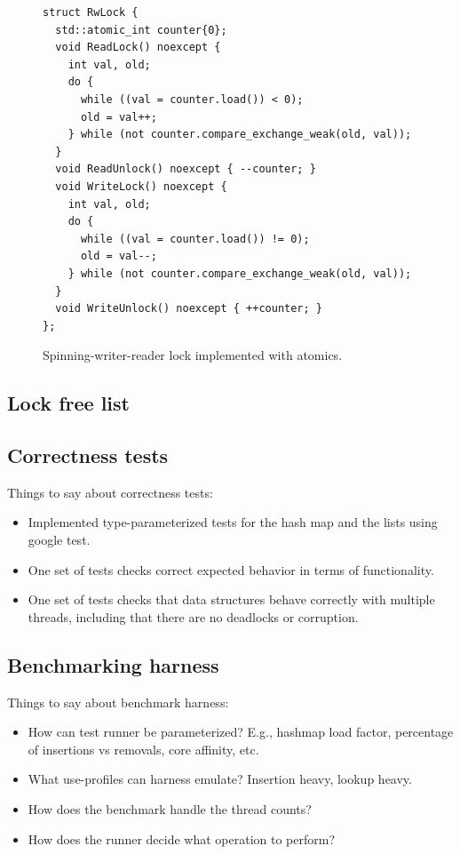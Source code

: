 \documentclass[11pt]{article}
\begin{document}
\begin{figure}
\begin{center}
\begin{lstlisting}
struct RwLock {
  std::atomic_int counter{0};
  void ReadLock() noexcept {
    int val, old;
    do {
      while ((val = counter.load()) < 0);
      old = val++;
    } while (not counter.compare_exchange_weak(old, val));
  }
  void ReadUnlock() noexcept { --counter; }
  void WriteLock() noexcept {
    int val, old;
    do {
      while ((val = counter.load()) != 0);
      old = val--;
    } while (not counter.compare_exchange_weak(old, val));
  }
  void WriteUnlock() noexcept { ++counter; }
};
\end{lstlisting}
\caption{Spinning-writer-reader lock implemented with atomics.}
\label{fig:rwlock}
\end{center}
\end{figure}

\subsection{Lock free list}

\subsection{Correctness tests}

Things to say about correctness tests:
\begin{itemize}
\item
Implemented type-parameterized tests for the hash map and the lists using google
test.
\item
One set of tests checks correct expected behavior in terms of functionality.
\item
One set of tests checks that data structures behave correctly with multiple
threads, including that there are no deadlocks or corruption.
\end{itemize}

\subsection{Benchmarking harness}

Things to say about benchmark harness:
\begin{itemize}
\item
How can test runner be parameterized? E.g., hashmap load factor, percentage of
insertions vs removals, core affinity, etc.
\item
What use-profiles can harness emulate? Insertion heavy, lookup heavy.
\item
How does the benchmark handle the thread counts?
\item
How does the runner decide what operation to perform?
\end{itemize}
\end{document}

